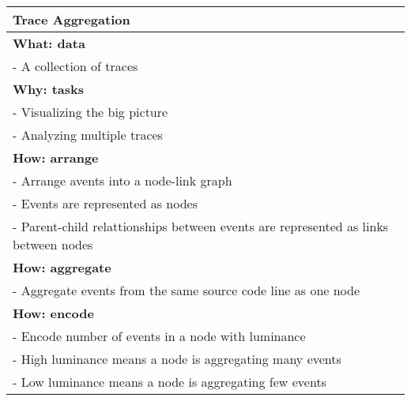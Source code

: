 \begin{center}
    \begin{tabular}{|p{}|}
        \hline
        \textbf{Trace Aggregation}                                                          \\
        \hline
        \textbf{What: data}                                                                 \\
        - A collection of traces                                                            \\
        \hline
        \textbf{Why: tasks}                                                                 \\
        - Visualizing the big picture                                                       \\
        - Analyzing multiple traces                                                         \\
        \hline
        \textbf{How: arrange}                                                               \\
        - Arrange avents into a node-link graph                                             \\
        - Events are represented as nodes                                                   \\
        - Parent-child relattionships between events are represented as links between nodes \\
        \textbf{How: aggregate}                                                            \\
        - Aggregate events from the same source code line as one node                       \\
        \textbf{How: encode}                                                                \\
        - Encode number of events in a node with luminance                                  \\
        - High luminance means a node is aggregating many events                            \\
        - Low luminance means a node is aggregating few events                              \\
        \hline
    \end{tabular}
\end{center}
